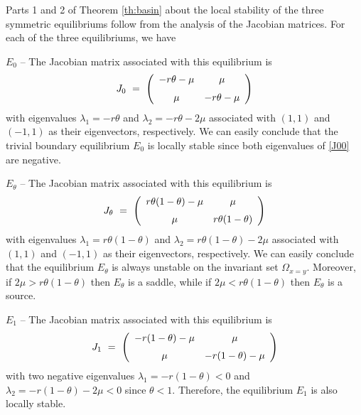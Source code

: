\indent Parts 1 and 2 of Theorem \ref{th:basin} about the local stability of the three symmetric equilibriums follow from the analysis
 of the Jacobian matrices.
 For each of the three equilibriums, we have
\begin{description}
\item {$E_0$ --} The Jacobian matrix associated with this equilibrium is
\begin{equation}
\label{J00}
 J_0 \ = \ \left(\begin{array}{cc} - r \theta - \mu & \mu \\ \noalign{\medskip} \mu & - r \theta - \mu \end{array} \right)
\end{equation}
 with eigenvalues $\lambda_1 = - r \theta$ and $\lambda_2 = - r \theta - 2 \mu$ associated with $(1, 1)$ and $(-1, 1)$ as their eigenvectors,
 respectively.
 We can easily conclude that the trivial boundary equilibrium $E_0$ is locally stable since both eigenvalues of \eqref{J00} are negative. \vspace{4pt}
\item {$E_{\theta}$ --} The Jacobian matrix associated with this equilibrium is
\begin{equation}
\label{Jtt}
 J_{\theta} \ = \ \left(\begin{array}{cc}  r \theta(1-\theta) - \mu & \mu \\ \noalign{\medskip} \mu & r \theta(1-\theta) \end{array} \right)
\end{equation}
 with eigenvalues $\lambda_1 =  r \theta (1 - \theta)$ and $\lambda_2 = r \theta (1 - \theta) - 2 \mu$ associated with $(1, 1)$ and $(-1, 1)$ as their
 eigenvectors, respectively.
 We can easily conclude that the equilibrium $E_{\theta}$ is always unstable on the invariant set $\Omega_{x = y}$.
 Moreover, if $2 \mu > r \theta (1 - \theta)$ then $E_{\theta}$ is a saddle, while if  $2 \mu < r \theta (1 - \theta)$ then $E_{\theta}$ is a source. \vspace{4pt}
 \item {$E_1$ --} The Jacobian matrix associated with this equilibrium is
\begin{equation}
\label{J11}
 J_1 \ = \ \left(\begin{array}{cc} - r (1 - \theta) - \mu & \mu \\ \noalign{\medskip} \mu & - r (1 - \theta) - \mu \end{array} \right)
\end{equation}
 with two negative eigenvalues $\lambda_1 = - r (1 - \theta) < 0$ and $\lambda_2 = - r (1 - \theta) - 2 \mu < 0$ since $\theta < 1$.
 Therefore, the equilibrium $E_1$ is also locally stable.
\end{description}
